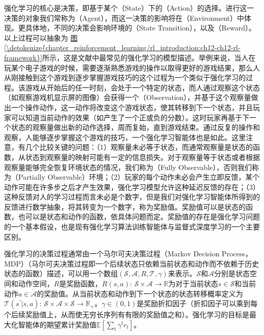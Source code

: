\documentclass[letterpaper,10pt,english]{sphinxmanual}
\begin{document}
\sphinxAtStartPar
强化学习的核心是决策，即基于某个（State）下的（Action）的选择。进行这一决策的对象我们常称为（Agent），而这一决策的影响将在（Environment）中体现。更具体地，不同的决策会影响环境的（State
Transition），以及（Reward）。以上过程可以抽象为
\hyperref[\detokenize{chapter_reinforcement_learning/rl_introduction:ch12-ch12-rl-framework}]{图\ref{\detokenize{chapter_reinforcement_learning/rl_introduction:ch12-ch12-rl-framework}}}所示，这是文献中最常见的强化学习的模型描述。举例来说，当人在玩某个电子游戏的时候，需要逐渐熟悉游戏的操作以取得更好的游戏结果，那么人从刚接触到这个游戏到逐步掌握游戏技巧的这个过程为一个类似于强化学习的过程。该游戏从开始后的任一时刻，会处于一个特定的状态，而人通过观察这个状态（如观察游戏机显示屏的图像）会获得一个（Observation），并基于这个观察量做出一个操作动作，这一动作将改变这个游戏状态，使其转移到下一个状态，并且玩家可以知道当前动作的效果（如产生了一个正或负的分数）。这时玩家再基于下一个状态的观察量做出新的动作选择，周而复始，直到游戏结束。通过反复的操作和观察，人能够逐步掌握这个游戏的技巧，一个强化学习智能体也是如此。这里注意，有几个比较关键的问题：（1）观察量未必等于状态，而通常观察量是状态的函数，从状态到观察量的映射可能有一定的信息损失。对于观察量等于状态或者根据观察量能够完全恢复环境状态的情况，我们称为（Fully
Observable），否则我们称为（Partially
Observable）环境；（2）玩家的每个动作未必会产生立即反馈，某个动作可能在许多步之后才产生效果，强化学习模型允许这种延迟反馈的存在；（3）这种反馈对人的学习过程而言未必是个数字，但是我们对强化学习智能体所得到的反馈进行数学抽象，将其转变为一个数字，称为奖励值。奖励值可以是状态的函数，也可以是状态和动作的函数，依具体问题而定。奖励值的存在是强化学习问题的一个基本假设，也是现有强化学习算法训练智能体与监督式深度学习的一个主要区别。

\sphinxAtStartPar
强化学习的决策过程通常由一个马尔可夫决策过程（Markov Decision
Process，MDP）（马尔可夫决策过程即一个后续状态只依赖当前状态和动作而不依赖于历史状态的函数）描述，可以用一个数组\((\mathcal{S}, \mathcal{A}, R, \mathcal{T}, \gamma)\)来表示。\(\mathcal{S}\)和\(\mathcal{A}\)分别是状态空间和动作空间，\(R\)是奖励函数，\(R(s,a)\):
\(\mathcal{S}\times \mathcal{A}\rightarrow \mathbb{R}\)为对于当前状态\(s\in\mathcal{S}\)和当前动作\(a\in\mathcal{A}\)的奖励值。从当前状态和动作到下一个状态的状态转移概率定义为\(\mathcal{T}(s^\prime|s,a)\):
\(\mathcal{S}\times\mathcal{A}\times\mathcal{S}\rightarrow \mathbb{R}_+\)。\(\gamma\in(0,1)\)是奖励折扣因子（折扣因子可以乘到每个后续奖励值上，从而使无穷长序列有有限的奖励值之和）。强化学习的目标是最大化智能体的期望累计奖励值\(\mathbb{E}[\sum_t \gamma^t r_t]\)。
\end{document}
